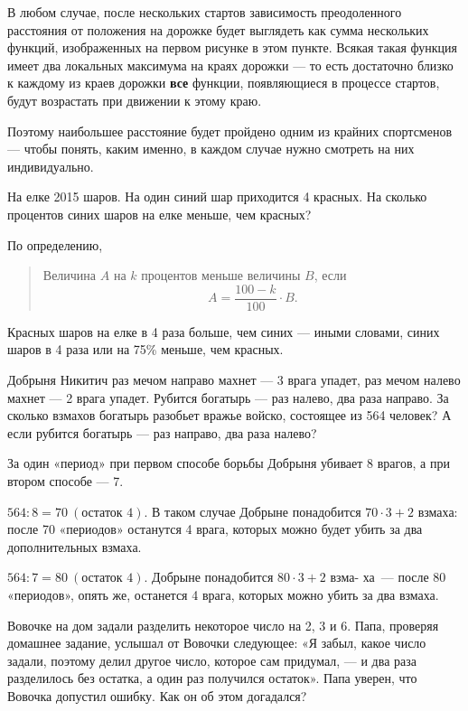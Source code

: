 \begin{itemize}
	В любом случае, после нескольких стартов зависимость преодоленного расстояния от положения на дорожке будет выглядеть как сумма нескольких функций, изображенных на первом рисунке в этом пункте. Всякая такая функция имеет два локальных максимума на краях дорожки — то есть достаточно близко к каждому из краев дорожки {\bfseries все} функции, появляющиеся в процессе стартов, будут возрастать при движении к этому краю.
	
	Поэтому наибольшее расстояние будет пройдено одним из крайних спортсменов — чтобы понять, каким именно, в каждом случае нужно смотреть на них индивидуально.

\end{itemize}


\begin{itemize}

	\itA На елке 2015 шаров. На один синий шар приходится 4 красных. На сколько процентов синих шаров на елке меньше, чем красных?
	
	\itr По определению,
	
	\begin{quote}
		Величина $A$ на $k$ процентов меньше величины $B$, если
		$$A = \frac{100-k}{100} \cdot B.$$
	\end{quote}
	
	Красных шаров на елке в 4 раза больше, чем синих — иными словами, синих шаров в 4 раза или на 75\% меньше, чем красных.

	\itB Добрыня Никитич раз мечом направо махнет — 3 врага упадет, раз мечом налево махнет — 2 врага упадет. Рубится богатырь — раз налево, два раза направо. За сколько взмахов богатырь разобьет вражье войско, состоящее из 564 человек? А если рубится богатырь — раз направо, два раза налево?
	
	\itr За один «период» при первом способе борьбы Добрыня убивает 8 врагов, а при втором способе — 7.
	
	\subitem $564 : 8 = 70\ (\text{остаток\ } 4)$. В таком случае Добрыне понадобится $70 \cdot 3 + 2$ взмаха: после 70 «периодов» останутся 4 врага, которых можно будет убить за два дополнительных взмаха.
	
	\subitem $564 : 7 = 80\ (\text{остаток\ } 4)$. Добрыне понадобится $80 \cdot 3 + 2$ взма- ха~— после 80 «периодов», опять же, останется 4 врага, которых \linebreak можно убить за два взмаха.
	
	\itC Вовочке на дом задали разделить некоторое число на 2, 3 и 6. Папа, проверяя домашнее задание, услышал от Вовочки следующее: «Я забыл, какое число задали, поэтому делил другое число, которое сам придумал, — и два раза разделилось без остатка, а один раз получился остаток». Папа уверен, что Вовочка допустил ошибку. Как он об этом догадался?
	

\end{itemize}
